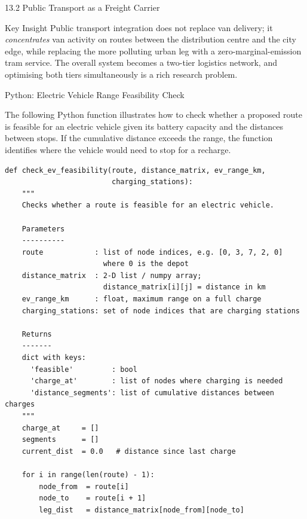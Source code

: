 \documentclass[aspectratio=169,10pt]{beamer}
\begin{document}
\begin{frame}[allowframebreaks]{13.2 Public Transport as a Freight Carrier}
  \begin{alertblock}{Key Insight}
    Public transport integration does not replace van delivery;
    it \emph{concentrates} van activity on routes between the
    distribution centre and the city edge, while replacing the
    more polluting urban leg with a zero-marginal-emission
    tram service.  The overall system becomes a two-tier
    logistics network, and optimising both tiers simultaneously
    is a rich research problem.
  \end{alertblock}

\end{frame}

\begin{frame}[fragile]{Python: Electric Vehicle Range Feasibility Check}

  The following Python function illustrates how to check whether
  a proposed route is feasible for an electric vehicle given its
  battery capacity and the distances between stops.  If the
  cumulative distance exceeds the range, the function identifies
  where the vehicle would need to stop for a recharge.

  \smallskip
  \begin{lstlisting}
def check_ev_feasibility(route, distance_matrix, ev_range_km,
                         charging_stations):
    """
    Checks whether a route is feasible for an electric vehicle.

    Parameters
    ----------
    route            : list of node indices, e.g. [0, 3, 7, 2, 0]
                       where 0 is the depot
    distance_matrix  : 2-D list / numpy array;
                       distance_matrix[i][j] = distance in km
    ev_range_km      : float, maximum range on a full charge
    charging_stations: set of node indices that are charging stations

    Returns
    -------
    dict with keys:
      'feasible'         : bool
      'charge_at'        : list of nodes where charging is needed
      'distance_segments': list of cumulative distances between charges
    """
    charge_at     = []
    segments      = []
    current_dist  = 0.0   # distance since last charge

    for i in range(len(route) - 1):
        node_from  = route[i]
        node_to    = route[i + 1]
        leg_dist   = distance_matrix[node_from][node_to]


\end{lstlisting}
\end{frame}
\end{document}
